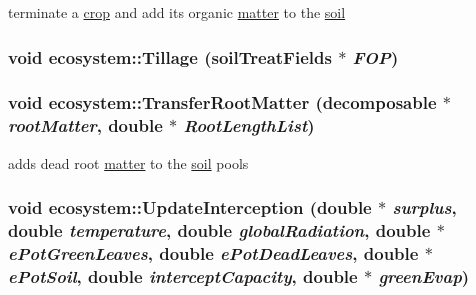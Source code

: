 terminate a \hyperlink{classcrop}{crop} and add its organic \hyperlink{classmatter}{matter} to the \hyperlink{classsoil}{soil} \hypertarget{classecosystem_a4b7c3eb9b9c14b213e9862854dda23ab}{
\subsubsection[{Tillage}]{\setlength{\rightskip}{0pt plus 5cm}void ecosystem::Tillage ({\bf soilTreatFields} $\ast$ {\em FOP})}}
\label{classecosystem_a4b7c3eb9b9c14b213e9862854dda23ab}
\hypertarget{classecosystem_a8355ba8e9658dde9faed9a4e90ac6548}{
\subsubsection[{TransferRootMatter}]{\setlength{\rightskip}{0pt plus 5cm}void ecosystem::TransferRootMatter ({\bf decomposable} $\ast$ {\em rootMatter}, \/  double $\ast$ {\em RootLengthList})}}
\label{classecosystem_a8355ba8e9658dde9faed9a4e90ac6548}


adds dead root \hyperlink{classmatter}{matter} to the \hyperlink{classsoil}{soil} pools \hypertarget{classecosystem_a326b1b05494d4637c425a256dd6fed4c}{
\subsubsection[{UpdateInterception}]{\setlength{\rightskip}{0pt plus 5cm}void ecosystem::UpdateInterception (double $\ast$ {\em surplus}, \/  double {\em temperature}, \/  double {\em globalRadiation}, \/  double $\ast$ {\em ePotGreenLeaves}, \/  double {\em ePotDeadLeaves}, \/  double $\ast$ {\em ePotSoil}, \/  double {\em interceptCapacity}, \/  double $\ast$ {\em greenEvap})}}
\label{classecosystem_a326b1b05494d4637c425a256dd6fed4c}

